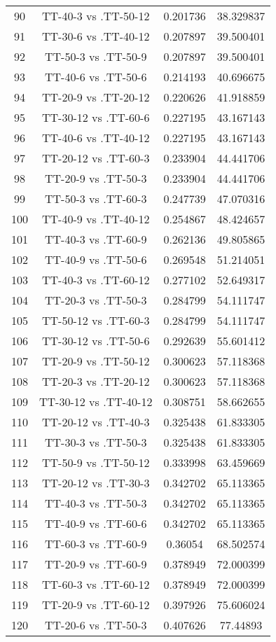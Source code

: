 \documentclass[a4paper,10pt]{article}
\begin{document}
\begin{landscape}
\begin{table}[!htp]
\begin{tabular}{cccc}
90&TT-40-3 vs .TT-50-12&0.201736&38.329837\\
91&TT-30-6 vs .TT-40-12&0.207897&39.500401\\
92&TT-50-3 vs .TT-50-9&0.207897&39.500401\\
93&TT-40-6 vs .TT-50-6&0.214193&40.696675\\
94&TT-20-9 vs .TT-20-12&0.220626&41.918859\\
95&TT-30-12 vs .TT-60-6&0.227195&43.167143\\
96&TT-40-6 vs .TT-40-12&0.227195&43.167143\\
97&TT-20-12 vs .TT-60-3&0.233904&44.441706\\
98&TT-20-9 vs .TT-50-3&0.233904&44.441706\\
99&TT-50-3 vs .TT-60-3&0.247739&47.070316\\
100&TT-40-9 vs .TT-40-12&0.254867&48.424657\\
101&TT-40-3 vs .TT-60-9&0.262136&49.805865\\
102&TT-40-9 vs .TT-50-6&0.269548&51.214051\\
103&TT-40-3 vs .TT-60-12&0.277102&52.649317\\
104&TT-20-3 vs .TT-50-3&0.284799&54.111747\\
105&TT-50-12 vs .TT-60-3&0.284799&54.111747\\
106&TT-30-12 vs .TT-50-6&0.292639&55.601412\\
107&TT-20-9 vs .TT-50-12&0.300623&57.118368\\
108&TT-20-3 vs .TT-20-12&0.300623&57.118368\\
109&TT-30-12 vs .TT-40-12&0.308751&58.662655\\
110&TT-20-12 vs .TT-40-3&0.325438&61.833305\\
111&TT-30-3 vs .TT-50-3&0.325438&61.833305\\
112&TT-50-9 vs .TT-50-12&0.333998&63.459669\\
113&TT-20-12 vs .TT-30-3&0.342702&65.113365\\
114&TT-40-3 vs .TT-50-3&0.342702&65.113365\\
115&TT-40-9 vs .TT-60-6&0.342702&65.113365\\
116&TT-60-3 vs .TT-60-9&0.36054&68.502574\\
117&TT-20-9 vs .TT-60-9&0.378949&72.000399\\
118&TT-60-3 vs .TT-60-12&0.378949&72.000399\\
119&TT-20-9 vs .TT-60-12&0.397926&75.606024\\
120&TT-20-6 vs .TT-50-3&0.407626&77.44893\\

\end{tabular}
\end{table}
\end{landscape}
\end{document}
